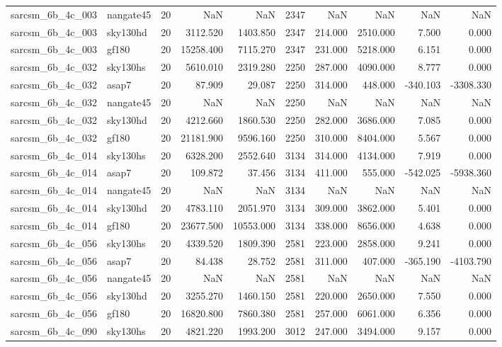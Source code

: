 \begin{longtable}{llrrrrrrrr}
sarcsm\_6b\_4c\_003 & nangate45 & 20 & NaN & NaN & 2347 & NaN & NaN & NaN & NaN \\
sarcsm\_6b\_4c\_003 & sky130hd & 20 & 3112.520 & 1403.850 & 2347 & 214.000 & 2510.000 & 7.500 & 0.000 \\
sarcsm\_6b\_4c\_003 & gf180 & 20 & 15258.400 & 7115.270 & 2347 & 231.000 & 5218.000 & 6.151 & 0.000 \\
sarcsm\_6b\_4c\_032 & sky130hs & 20 & 5610.010 & 2319.280 & 2250 & 287.000 & 4090.000 & 8.777 & 0.000 \\
sarcsm\_6b\_4c\_032 & asap7 & 20 & 87.909 & 29.087 & 2250 & 314.000 & 448.000 & -340.103 & -3308.330 \\
sarcsm\_6b\_4c\_032 & nangate45 & 20 & NaN & NaN & 2250 & NaN & NaN & NaN & NaN \\
sarcsm\_6b\_4c\_032 & sky130hd & 20 & 4212.660 & 1860.530 & 2250 & 282.000 & 3686.000 & 7.085 & 0.000 \\
sarcsm\_6b\_4c\_032 & gf180 & 20 & 21181.900 & 9596.160 & 2250 & 310.000 & 8404.000 & 5.567 & 0.000 \\
sarcsm\_6b\_4c\_014 & sky130hs & 20 & 6328.200 & 2552.640 & 3134 & 314.000 & 4134.000 & 7.919 & 0.000 \\
sarcsm\_6b\_4c\_014 & asap7 & 20 & 109.872 & 37.456 & 3134 & 411.000 & 555.000 & -542.025 & -5938.360 \\
sarcsm\_6b\_4c\_014 & nangate45 & 20 & NaN & NaN & 3134 & NaN & NaN & NaN & NaN \\
sarcsm\_6b\_4c\_014 & sky130hd & 20 & 4783.110 & 2051.970 & 3134 & 309.000 & 3862.000 & 5.401 & 0.000 \\
sarcsm\_6b\_4c\_014 & gf180 & 20 & 23677.500 & 10553.000 & 3134 & 338.000 & 8656.000 & 4.638 & 0.000 \\
sarcsm\_6b\_4c\_056 & sky130hs & 20 & 4339.520 & 1809.390 & 2581 & 223.000 & 2858.000 & 9.241 & 0.000 \\
sarcsm\_6b\_4c\_056 & asap7 & 20 & 84.438 & 28.752 & 2581 & 311.000 & 407.000 & -365.190 & -4103.790 \\
sarcsm\_6b\_4c\_056 & nangate45 & 20 & NaN & NaN & 2581 & NaN & NaN & NaN & NaN \\
sarcsm\_6b\_4c\_056 & sky130hd & 20 & 3255.270 & 1460.150 & 2581 & 220.000 & 2650.000 & 7.550 & 0.000 \\
sarcsm\_6b\_4c\_056 & gf180 & 20 & 16820.800 & 7860.380 & 2581 & 257.000 & 6061.000 & 6.356 & 0.000 \\
sarcsm\_6b\_4c\_090 & sky130hs & 20 & 4821.220 & 1993.200 & 3012 & 247.000 & 3494.000 & 9.157 & 0.000 \\

\end{longtable}
